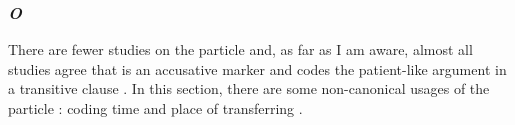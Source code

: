 \subsubsection{\textit{O}}

There are fewer studies on the particle  and,
as far as I am aware, almost all studies agree that  is an accusative marker
and codes the patient-like argument in a transitive clause \cite[e.g.,][]{yamada36,shibatani90}.
In this section,
there are some non-canonical usages of the particle :
coding time and place of transferring \cite{yamada36}.

%
%
%
%
